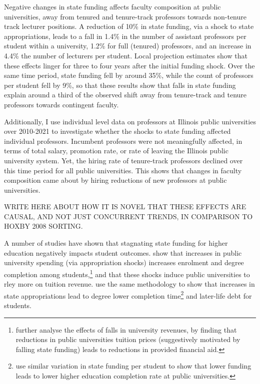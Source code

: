 Negative changes in state funding affects faculty composition at public universities, away from tenured and tenure-track professors towards non-tenure track lecturer positions.
A reduction of 10\% in state funding, via a shock to state appropriations, leads to a fall in 1.4\% in the number of assistant professors per student within a university, 1.2\% for full (tenured) professors, and an increase in 4.4\% the number of lecturers per student.
Local projection estimates show that these effects linger for three to four years after the initial funding shock.
Over the same time period, state funding fell by around 35\%, while the count of professors per student fell by 9\%, so that these results show that falls in state funding explain around a third of the observed shift away from tenure-track and tenure professors towards contingent faculty.

Additionally, I use individual level data on professors at Illinois public universities over 2010-2021 to investigate whether the shocks to state funding affected individual professors.
Incumbent professors were not meaningfully affected, in terms of total salary, promotion rate, or rate of leaving the Illinois public university system.
Yet, the hiring rate of tenure-track professors declined over this time period for all public universities.
This shows that changes in faculty composition came about by hiring reductions of new professors at public universities.

WRITE HERE ABOUT HOW IT IS NOVEL THAT THESE EFFECTS ARE CAUSAL, AND NOT JUST CONCURRENT TRENDS, IN COMPARISON TO HOXBY 2008 SORTING.

A number of studies have shown that stagnating state funding for higher education negatively impacts student outcomes.
\cite{NBERw23736} show that increases in public university spending (via appropriation shocks) increases enrolment and degree completion among students,\footnote{
    \cite{miller2022making} further analyse the effects of falls in university revenues, by finding that reductions in public universities tuition prices (suggestively motivated by falling state funding) leads to reductions in provided financial aid.
}
and \cite{bound2019public} that these shocks induce public universities to rley more on tuition revenue.
\cite{NBERw27885} use the same methodology to show that increases in state appropriations lead to degree lower completion time\footnote{
    \cite{bound2007cohort} use similar variation in state funding per student to show that lower funding leads to lower higher education completion rate at public universities.
} and later-life debt for students.

